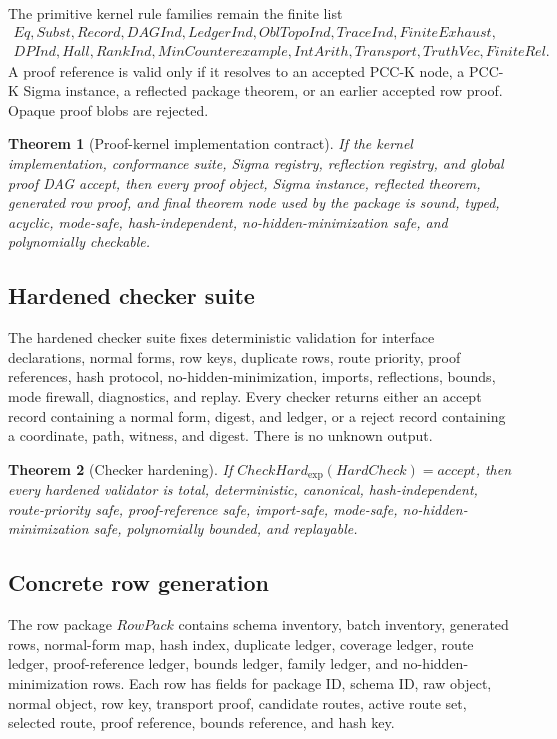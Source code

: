 \documentclass[10.5pt,a4paper]{article}
\newtheorem{theorem}{Theorem}[section]
\begin{document}
The primitive kernel rule families remain the finite list
\[
\begin{gathered}
Eq, Subst, Record, DAGInd, LedgerInd, OblTopoInd, TraceInd, FiniteExhaust,\\
DPInd, Hall, RankInd, MinCounterexample, IntArith, Transport, TruthVec, FiniteRel.
\end{gathered}
\]
A proof reference is valid only if it resolves to an accepted PCC-K node, a PCC-K Sigma instance, a reflected package theorem, or an earlier accepted row proof. Opaque proof blobs are rejected.

\begin{theorem}[Proof-kernel implementation contract]
If the kernel implementation, conformance suite, Sigma registry, reflection registry, and global proof DAG accept, then every proof object, Sigma instance, reflected theorem, generated row proof, and final theorem node used by the package is sound, typed, acyclic, mode-safe, hash-independent, no-hidden-minimization safe, and polynomially checkable.
\end{theorem}

\subsection{Hardened checker suite}
The hardened checker suite fixes deterministic validation for interface declarations, normal forms, row keys, duplicate rows, route priority, proof references, hash protocol, no-hidden-minimization, imports, reflections, bounds, mode firewall, diagnostics, and replay.  Every checker returns either an accept record containing a normal form, digest, and ledger, or a reject record containing a coordinate, path, witness, and digest. There is no unknown output.

\begin{theorem}[Checker hardening]
If \(CheckHard_{\exp}(HardCheck)=accept\), then every hardened validator is total, deterministic, canonical, hash-independent, route-priority safe, proof-reference safe, import-safe, mode-safe, no-hidden-minimization safe, polynomially bounded, and replayable.
\end{theorem}

\subsection{Concrete row generation}
The row package \(RowPack\) contains schema inventory, batch inventory, generated rows, normal-form map, hash index, duplicate ledger, coverage ledger, route ledger, proof-reference ledger, bounds ledger, family ledger, and no-hidden-minimization rows. Each row has fields for package ID, schema ID, raw object, normal object, row key, transport proof, candidate routes, active route set, selected route, proof reference, bounds reference, and hash key.
\end{document}
